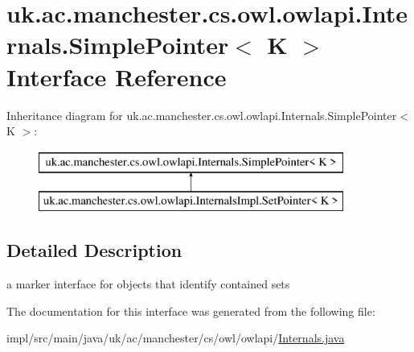 \hypertarget{interfaceuk_1_1ac_1_1manchester_1_1cs_1_1owl_1_1owlapi_1_1_internals_1_1_simple_pointer_3_01_k_01_4}{\section{uk.\-ac.\-manchester.\-cs.\-owl.\-owlapi.\-Internals.\-Simple\-Pointer$<$ K $>$ Interface Reference}
\label{interfaceuk_1_1ac_1_1manchester_1_1cs_1_1owl_1_1owlapi_1_1_internals_1_1_simple_pointer_3_01_k_01_4}
}
Inheritance diagram for uk.\-ac.\-manchester.\-cs.\-owl.\-owlapi.\-Internals.\-Simple\-Pointer$<$ K $>$\-:\begin{figure}[H]
\begin{center}
\leavevmode
\includegraphics[height=2.000000cm]{interfaceuk_1_1ac_1_1manchester_1_1cs_1_1owl_1_1owlapi_1_1_internals_1_1_simple_pointer_3_01_k_01_4}
\end{center}
\end{figure}


\subsection{Detailed Description}
a marker interface for objects that identify contained sets 

The documentation for this interface was generated from the following file\-:\begin{DoxyCompactItemize}
\item 
impl/src/main/java/uk/ac/manchester/cs/owl/owlapi/\hyperlink{_internals_8java}{Internals.\-java}\end{DoxyCompactItemize}
